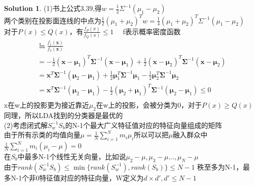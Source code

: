 \documentclass[a4paper,UTF8]{article}
\numberwithin{equation}{section}
\theoremstyle{definition}
\newtheorem*{solution}{Solution}
\begin{document}
\begin{solution}
(1)书上公式3.39,得$w=\frac{1}{2} \Sigma^{-1} (\mu_1-\mu_2)$\\
两个类别在投影面连线的中点为$\frac{1}{2}(\mu_1+\mu_2)^T w=\frac{1}{4}(\mu_1+\mu_2)^T \Sigma^{-1} (\mu_1-\mu_2)$\\
对于$P(x)\leq Q(x)$，有$\frac{f_P(x)}{f_Q(x)}\leq 1 \quad$ f表示概率密度函数\\
\begin{align*}
&\ln \frac{f_1(\boldsymbol{x})}{f_2(\boldsymbol{x})}\\
&=-\frac{1}{2}(\boldsymbol{x}-\boldsymbol{\mu}_1)^T\boldsymbol{\Sigma}^{-1}(\boldsymbol{x}-\boldsymbol{\mu}_1)+\frac{1}{2}(\boldsymbol{x}-\boldsymbol{\mu}_2)^T\boldsymbol{\Sigma}^{-1}(\boldsymbol{x}-\boldsymbol{\mu}_2)\\
&= \boldsymbol{x}^T\boldsymbol{\Sigma}^{-1}(\boldsymbol{\mu}_2 - \boldsymbol{\mu}_1) + \frac{1}{2}\boldsymbol{\mu}_1^T\boldsymbol{\Sigma}^{-1}\boldsymbol{\mu}_1 - \frac{1}{2}\boldsymbol{\mu}_2^T\boldsymbol{\Sigma}^{-1}\boldsymbol{\mu}_2\\
&=\boldsymbol{x}^T\boldsymbol{\Sigma}^{-1}(\boldsymbol{\mu}_2 - \boldsymbol{\mu}_1)-\frac{1}{2}(\boldsymbol{\mu}_2+\boldsymbol{\mu}_1)^T\boldsymbol{\Sigma}^{-1}(\boldsymbol{\mu}_2-\boldsymbol{\mu}_1)\leq 0\\
\end{align*}
x在w上的投影更为接近靠近$\mu_2$在w上的投影，会被分类为0，对于$P(x)\geq Q(x)$同理，所以LDA找到的分类器是最优的\\
(2)考虑闭式解$S_w^{-1}S_b$的N-1个最大广义特征值对应的特征向量组成的矩阵\\
由于$\mbox{所有示类的均值向量}\mu=\frac{1}{N} \sum_{i=1}^{N}m_i \mu_i$所以可以把$\mu$融入群众中\\
$\frac{1}{N} \sum_{i=1}^{N}m_i (\mu_i-\mu)=0$\\在$S_b$中最多N-1个线性无关向量，比如说$\mu_2-\mu,\mu_3-\mu...,\mu_N-\mu$\\
由于$rank(S_w^{-1}S_b)\leq \min\{rank(S_w^{-1}),rank(S_b)\}\leq N-1$
秩至多为N-1，最多N-1个非0特征值对应的特征向量，W定义为$d \times d',d'\leq N-1$
\end{solution}

\newpage
\end{document}
